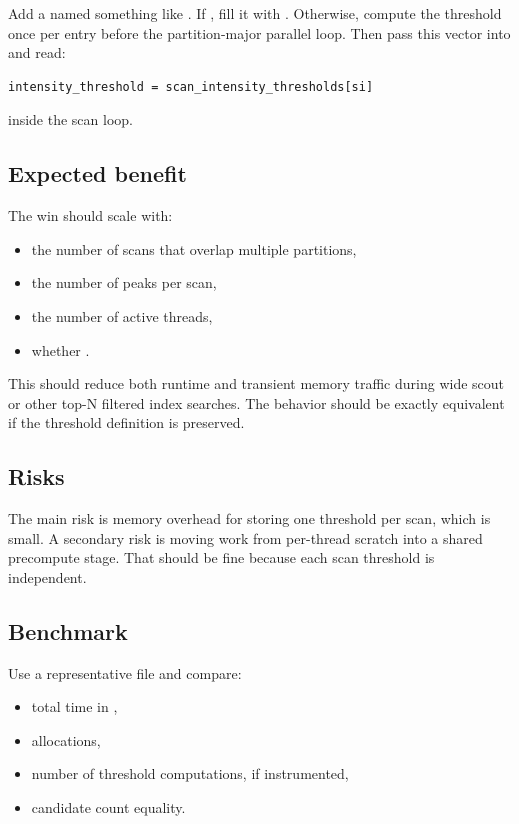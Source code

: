 \documentclass[11pt]{article}
\begin{document}
Add a  named something like .
If , fill it with . Otherwise, compute the
threshold once per  entry before the partition-major
parallel loop. Then pass this vector into  and read:

\begin{verbatim}
intensity_threshold = scan_intensity_thresholds[si]
\end{verbatim}

inside the scan loop.

\subsection*{Expected benefit}

The win should scale with:

\begin{itemize}
  \item the number of scans that overlap multiple partitions,
  \item the number of peaks per scan,
  \item the number of active threads,
  \item whether .
\end{itemize}

This should reduce both runtime and transient memory traffic during wide scout
or other top-N filtered index searches. The behavior should be exactly
equivalent if the threshold definition is preserved.

\subsection*{Risks}

The main risk is memory overhead for storing one threshold per scan, which is
small. A secondary risk is moving work from per-thread scratch into a shared
precompute stage. That should be fine because each scan threshold is independent.

\subsection*{Benchmark}

Use a representative file and compare:

\begin{itemize}
  \item total time in ,
  \item allocations,
  \item number of threshold computations, if instrumented,
  \item candidate count equality.
\end{itemize}
\end{document}
